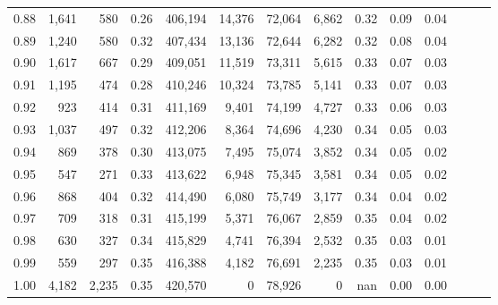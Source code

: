 \begin{tabular}{rrrrrrrrrrrrrr}
0.88 &   1,641 &    580 &  0.26 &  406,194 &   14,376 &  72,064 &   6,862 &  0.32 &  0.09 &      0.04 \\
0.89 &   1,240 &    580 &  0.32 &  407,434 &   13,136 &  72,644 &   6,282 &  0.32 &  0.08 &      0.04 \\
0.90 &   1,617 &    667 &  0.29 &  409,051 &   11,519 &  73,311 &   5,615 &  0.33 &  0.07 &      0.03 \\
0.91 &   1,195 &    474 &  0.28 &  410,246 &   10,324 &  73,785 &   5,141 &  0.33 &  0.07 &      0.03 \\
0.92 &     923 &    414 &  0.31 &  411,169 &    9,401 &  74,199 &   4,727 &  0.33 &  0.06 &      0.03 \\
0.93 &   1,037 &    497 &  0.32 &  412,206 &    8,364 &  74,696 &   4,230 &  0.34 &  0.05 &      0.03 \\
0.94 &     869 &    378 &  0.30 &  413,075 &    7,495 &  75,074 &   3,852 &  0.34 &  0.05 &      0.02 \\
0.95 &     547 &    271 &  0.33 &  413,622 &    6,948 &  75,345 &   3,581 &  0.34 &  0.05 &      0.02 \\
0.96 &     868 &    404 &  0.32 &  414,490 &    6,080 &  75,749 &   3,177 &  0.34 &  0.04 &      0.02 \\
0.97 &     709 &    318 &  0.31 &  415,199 &    5,371 &  76,067 &   2,859 &  0.35 &  0.04 &      0.02 \\
0.98 &     630 &    327 &  0.34 &  415,829 &    4,741 &  76,394 &   2,532 &  0.35 &  0.03 &      0.01 \\
0.99 &     559 &    297 &  0.35 &  416,388 &    4,182 &  76,691 &   2,235 &  0.35 &  0.03 &      0.01 \\
1.00 &   4,182 &  2,235 &  0.35 &  420,570 &        0 &  78,926 &       0 &   nan &  0.00 &      0.00 \\
\bottomrule
\end{tabular}
